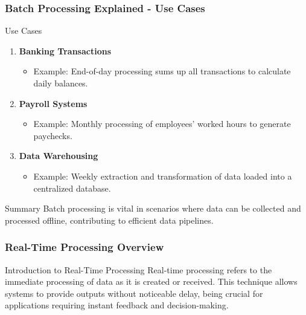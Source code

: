 \documentclass[aspectratio=169]{beamer}
\begin{document}
\begin{frame}[fragile]
    \frametitle{Batch Processing Explained - Use Cases}
    \begin{block}{Use Cases}
        \begin{enumerate}
            \item \textbf{Banking Transactions}
                \begin{itemize}
                    \item Example: End-of-day processing sums up all transactions to calculate daily balances.
                \end{itemize}
            \item \textbf{Payroll Systems}
                \begin{itemize}
                    \item Example: Monthly processing of employees' worked hours to generate paychecks.
                \end{itemize}
            \item \textbf{Data Warehousing}
                \begin{itemize}
                    \item Example: Weekly extraction and transformation of data loaded into a centralized database.
                \end{itemize}
        \end{enumerate}
    \end{block}
    
    \begin{block}{Summary}
        Batch processing is vital in scenarios where data can be collected and processed offline, contributing to efficient data pipelines.
    \end{block}
\end{frame}

\begin{frame}[fragile]
    \frametitle{Real-Time Processing Overview}
    \begin{block}{Introduction to Real-Time Processing}
        Real-time processing refers to the immediate processing of data as it is created or received. This technique allows systems to provide outputs without noticeable delay, being crucial for applications requiring instant feedback and decision-making.
    \end{block}
\end{frame}
\end{document}
